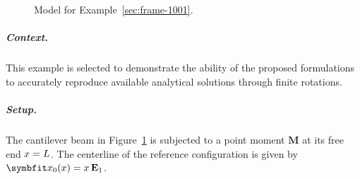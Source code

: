 

\begin{figure}[H]
    \centering
    \caption{Model for Example~\ref{sec:frame-1001}.}
    \label{fig:frame-1001}
\end{figure}
%
\subparagraph{Context.}
This example is selected to demonstrate the ability of the proposed formulations to accurately reproduce available analytical solutions through finite rotations.

\subparagraph{Setup.}
The cantilever beam  in Figure~\ref{fig:frame-1001} is subjected to a point moment \(\bm{M}\) at its free end \(x=L\). 
%
The centerline of the reference configuration 
is given by \(\bm{x}_0(\reflenx) = \reflenx\,\mathbf{E}_1\).
%

